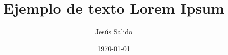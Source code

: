 \documentclass[11pt]{article}
\title{Ejemplo de texto Lorem Ipsum}
\author{Jesús Salido}
\date{\today}
\begin{document}
\maketitle
\Blinddocument 
\end{document}
